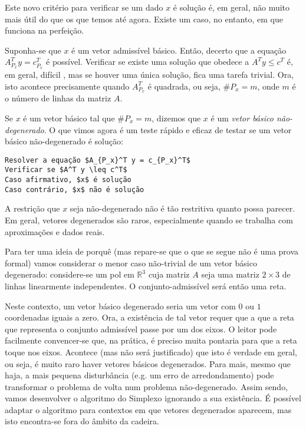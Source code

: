 \documentclass{article}
\newcommand{\R}{\mathbb{R}}
\theoremstyle{definition}
\begin{document}
	Este novo critério para verificar se um dado $x$ é solução é, em geral, não muito mais útil do que os que temos até agora. Existe um caso, no entanto, em que funciona na perfeição.
	
	Suponha-se que $x$ é um vetor admissível básico. Então, decerto que a equação $A_{P_x}^T y = c^T_{P_x}$ é possível. Verificar se existe uma solução que obedece a $A^T y \leq c^T$ é, em geral, difícil
, mas se houver uma única solução, fica uma tarefa trivial. Ora, isto acontece precisamente quando $A_{P_x}^T$ é quadrada, ou seja, $\# P_x = m$, onde $m$ é o número de linhas da matriz $A$.

	Se $x$ é um vetor básico tal que $\#P_x = m$, dizemos que $x$ é um \emph{vetor básico não-degenerado}. O que vimos agora é um teste rápido e eficaz de testar se um vetor básico não-degenerado é solução:
	
	\begin{lstlisting}[mathescape=true, keepspaces=true]
Resolver a equação $A_{P_x}^T y = c_{P_x}^T$
Verificar se $A^T y \leq c^T$
Caso afirmativo, $x$ é solução
Caso contrário, $x$ não é solução \end{lstlisting}

	A restrição que $x$ seja não-degenerado não é tão restritiva quanto possa parecer. Em geral, vetores degenerados são raros, especialmente quando se trabalha com aproximações e dados reais.
	
	Para ter uma ideia de porquê (mas repare-se que o que se segue não é uma prova formal) vamos considerar o menor caso não-trivial de um vetor básico degenerado: considere-se um pol em $\R^3$ cuja matriz $A$ seja uma matriz $2 \times 3$ de linhas linearmente independentes. O conjunto-admissível será então uma reta.
	
	Neste contexto, um vetor básico degenerado seria um vetor com $0$ ou $1$ coordenadas iguais a zero. Ora, a existência de tal vetor requer que a que a reta que representa o conjunto admissível passe por um dos eixos. O leitor pode facilmente convencer-se que, na prática, é preciso muita pontaria para que a reta toque nos eixos. Acontece (mas não será justificado) que isto é verdade em geral, ou seja, é muito raro haver vetores básicos degenerados. Para mais, mesmo que haja, a mais pequena disturbância (e.g. um erro de arredondamento) pode transformar o problema de volta num problema não-degenerado. Assim sendo, vamos desenvolver o algoritmo do Simplexo ignorando a sua existência. É possível adaptar o algoritmo para contextos em que vetores degenerados aparecem, mas isto encontra-se fora do âmbito da cadeira.
	
\end{document}
